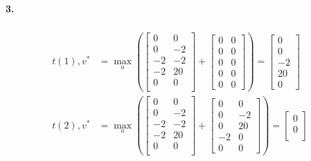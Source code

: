 \paragraph*{3.}
\begin{align}
    \begin{split}
        t(1), v^*&=\max\limits_a\left(
        \begin{bmatrix}
            0 & 0 \\
            0 & -2\\
            -2 & -2\\
            -2 & 20\\
            0 & 0\\
        \end{bmatrix}+
        \begin{bmatrix}
            0 & 0\\
            0 & 0\\
            0 & 0\\
            0 & 0\\
            0 & 0
        \end{bmatrix}
        \right)=
        \begin{bmatrix}
            0\\
            0\\
            -2\\
            20\\
            0
        \end{bmatrix}\\
        t(2), v^*&=\max\limits_a\left(
        \begin{bmatrix}
            0 & 0 \\
            0 & -2\\
            -2 & -2\\
            -2 & 20\\
            0 & 0\\
        \end{bmatrix}+
        \begin{bmatrix}
            0 & 0\\
            0 & -2\\
            0 & 20\\
            -2 & 0\\
            0 & 0
        \end{bmatrix}
        \right)=
        \begin{bmatrix}
            0\\
            0\\

\end{bmatrix}
\end{split}
\end{align}
